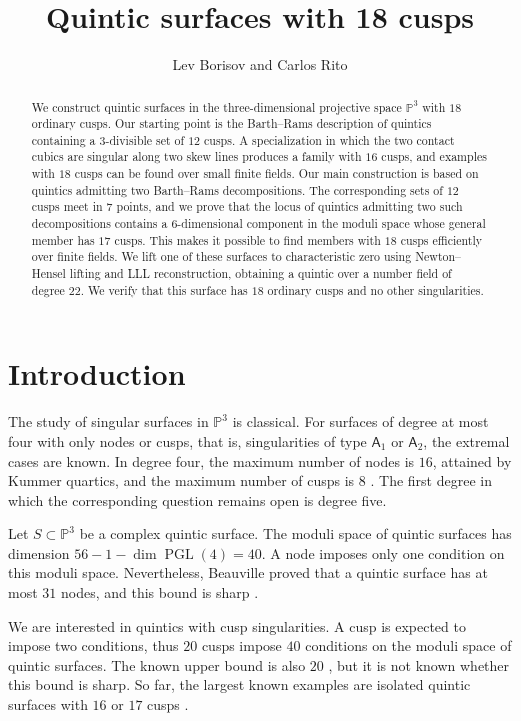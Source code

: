 \documentclass[10pt,a4paper]{article}
\title{Quintic surfaces with 18 cusps}
\author{Lev Borisov and Carlos Rito}
\date{}
\begin{document}
\maketitle

\begin{abstract}
We construct quintic surfaces in the three-dimensional projective space
$\mathbb P^3$ with $18$ ordinary cusps.  Our starting point is the
Barth--Rams description of quintics containing a $3$-divisible set of $12$
cusps.  A specialization in which the two contact cubics are singular along
two skew lines produces a family with $16$ cusps, and examples with $18$
cusps can be found over small finite fields.  Our main construction
is based on quintics admitting two Barth--Rams decompositions.
The corresponding sets of $12$ cusps meet in $7$ points,
and we prove that the locus of quintics admitting two such decompositions
contains a $6$-dimensional component in the moduli space whose general member
has $17$ cusps. This makes it possible to find members with $18$ cusps
efficiently over finite fields.
We lift one of these surfaces to characteristic
zero using Newton--Hensel lifting and LLL reconstruction, obtaining a
quintic over a number field of degree $22$. We verify that this surface has
$18$ ordinary cusps and no other singularities.
\end{abstract}



\section{Introduction}
\label{sec:introduction}

The study of singular surfaces in $\mathbb P^3$ is classical.  For surfaces of
degree at most four with only nodes or cusps, that is, singularities of type
$\mathsf A_1$ or $\mathsf A_2$, the extremal cases are known.  In degree four,
the maximum number of nodes is $16$, attained by Kummer quartics, and the
maximum number of cusps is $8$ \cite{Barth_nine_cusps}.  The first degree in
which the corresponding question remains open is degree five.

Let $S\subset \mathbb P^3$ be a complex quintic surface.  The moduli space of
quintic surfaces has dimension $56-1-\dim \operatorname{PGL}(4)=40$.
A node imposes only one condition on this moduli space.  Nevertheless,
Beauville proved that a quintic surface has at most $31$ nodes, and this bound
is sharp \cite{Beauville_nodes_quintics}.

We are interested in quintics with cusp singularities. A cusp is expected to
impose two conditions, thus $20$ cusps impose $40$ conditions on the
moduli space of quintic surfaces. The known upper bound is also $20$
\cite{Tan_cusps}, but it is not known whether this bound is sharp. So far,
the largest known examples are isolated quintic surfaces with $16$ or $17$
cusps \cite{Rito_cuspidal}.
\end{document}
